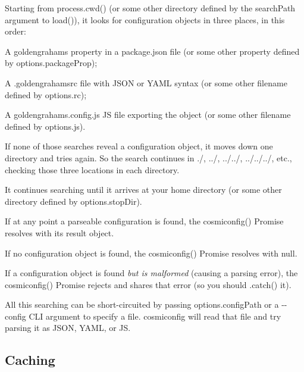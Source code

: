 \begin{DoxyItemize}
\item Starting from {\ttfamily process.\+cwd()} (or some other directory defined by the {\ttfamily search\+Path} argument to {\ttfamily load()}), it looks for configuration objects in three places, in this order\+:
\begin{DoxyEnumerate}
\item A {\ttfamily goldengrahams} property in a {\ttfamily package.\+json} file (or some other property defined by {\ttfamily options.\+package\+Prop});
\item A {\ttfamily .goldengrahamsrc} file with J\+S\+ON or Y\+A\+ML syntax (or some other filename defined by {\ttfamily options.\+rc});
\item A {\ttfamily goldengrahams.\+config.\+js} JS file exporting the object (or some other filename defined by {\ttfamily options.\+js}).
\end{DoxyEnumerate}
\item If none of those searches reveal a configuration object, it moves down one directory and tries again. So the search continues in {\ttfamily ./}, {\ttfamily ../}, {\ttfamily ../../}, {\ttfamily ../../../}, etc., checking those three locations in each directory.
\item It continues searching until it arrives at your home directory (or some other directory defined by {\ttfamily options.\+stop\+Dir}).
\item If at any point a parseable configuration is found, the {\ttfamily cosmiconfig()} Promise resolves with its result object.
\item If no configuration object is found, the {\ttfamily cosmiconfig()} Promise resolves with {\ttfamily null}.
\item If a configuration object is found {\itshape but is malformed} (causing a parsing error), the {\ttfamily cosmiconfig()} Promise rejects and shares that error (so you should {\ttfamily .catch()} it).
\end{DoxyItemize}

All this searching can be short-\/circuited by passing {\ttfamily options.\+config\+Path} or a {\ttfamily -\/-\/config} C\+LI argument to specify a file. cosmiconfig will read that file and try parsing it as J\+S\+ON, Y\+A\+ML, or JS.

\subsection*{Caching}


